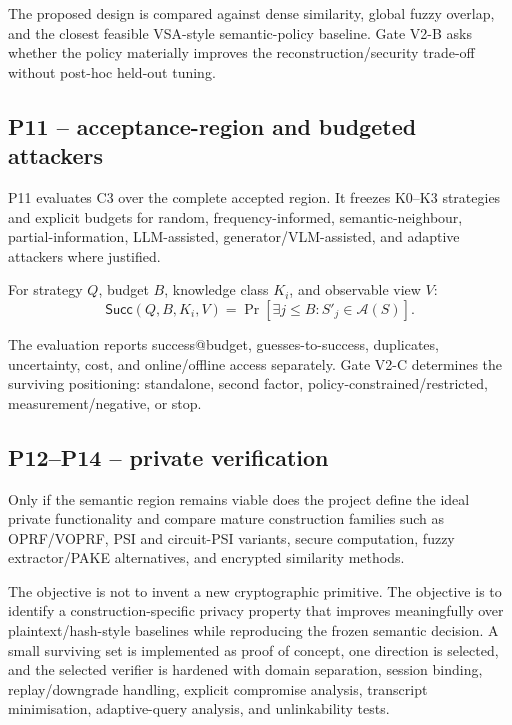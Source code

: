 \documentclass[11pt,a4paper]{article}
\newcommand{\Aset}{\mathcal{A}}
\begin{document}
The proposed design is compared against dense similarity, global fuzzy overlap, and the closest feasible VSA-style semantic-policy baseline. Gate V2-B asks whether the policy materially improves the reconstruction/security trade-off without post-hoc held-out tuning.

\subsection{P11 -- acceptance-region and budgeted attackers}

P11 evaluates C3 over the complete accepted region. It freezes K0--K3 strategies and explicit budgets for random, frequency-informed, semantic-neighbour, partial-information, LLM-assisted, generator/VLM-assisted, and adaptive attackers where justified.

For strategy $Q$, budget $B$, knowledge class $K_i$, and observable view $V$:
\begin{equation}
  \mathsf{Succ}(Q,B,K_i,V)=
  \Pr[\exists j\le B: S'_j\in\Aset(S)].
\end{equation}

The evaluation reports success@budget, guesses-to-success, duplicates, uncertainty, cost, and online/offline access separately. Gate V2-C determines the surviving positioning: standalone, second factor, policy-constrained/restricted, measurement/negative, or stop.

\subsection{P12--P14 -- private verification}

Only if the semantic region remains viable does the project define the ideal private functionality and compare mature construction families such as OPRF/VOPRF, PSI and circuit-PSI variants, secure computation, fuzzy extractor/PAKE alternatives, and encrypted similarity methods.

The objective is not to invent a new cryptographic primitive. The objective is to identify a construction-specific privacy property that improves meaningfully over plaintext/hash-style baselines while reproducing the frozen semantic decision. A small surviving set is implemented as proof of concept, one direction is selected, and the selected verifier is hardened with domain separation, session binding, replay/downgrade handling, explicit compromise analysis, transcript minimisation, adaptive-query analysis, and unlinkability tests.
\end{document}
